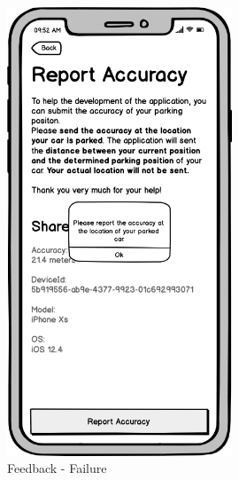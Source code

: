 \begin{figure}[h!]
  \centering
  \hfill
  \begin{minipage}[b]{0.49\textwidth}
    \centering
    \includegraphics[width=0.6\textwidth]{images/UI/Iteration4-Feedback-Failure.png}
    \caption{Feedback - Failure}
    \label{fig:feedback-fail}
  \end{minipage}
  \hfill
  \begin{minipage}[b]{0.49\textwidth}
    \centering

\end{minipage}
\end{figure}
